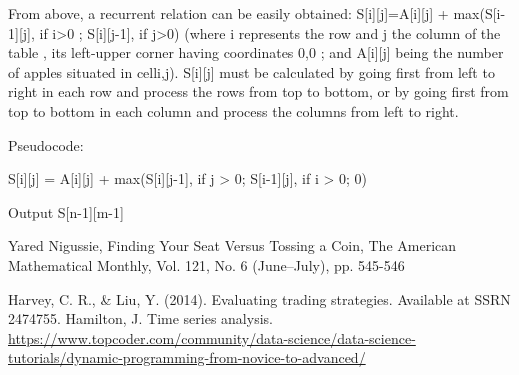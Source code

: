 \documentclass[10pt, onecolumn, draftcls]{IEEEtran}
\begin{document}
\begin{enumerate}
From above, a recurrent relation can be easily obtained:
S[i][j]=A[i][j] + max(S[i-1][j], if i>0 ; S[i][j-1], if j>0) (where i represents the row and j the column of the table , its left-upper corner having coordinates {0,0} ; and A[i][j] being the number of apples situated in celli,j). S[i][j] must be calculated by going first from left to right in each row and process the rows from top to bottom, or by going first from top to bottom in each column and process the columns from left to right.

Pseudocode:
\begin{algorithmic}
    S[i][j] = A[i][j] + max(S[i][j-1], if j > 0; S[i-1][j], if i > 0; 0)
\EndFor
\EndFor
\end{algorithmic}
Output S[n-1][m-1]

\end{enumerate}


\begin{thebibliography}{9}

Yared Nigussie, Finding Your Seat Versus Tossing a Coin, The American Mathematical Monthly, Vol. 121, No. 6 (June–July), pp. 545-546


 Harvey, C. R., \& Liu, Y. (2014). Evaluating trading strategies. Available at SSRN 2474755.
 Hamilton, J. Time series analysis. 
 \url{https://www.topcoder.com/community/data-science/data-science-tutorials/dynamic-programming-from-novice-to-advanced/}
\end{thebibliography}
\end{document}
